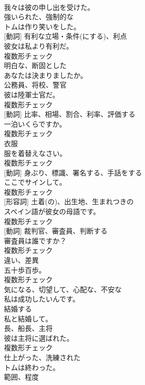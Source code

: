 \documentclass[8pt]{extreport}
\begin{document}
\begin{CJK}{UTF8}{min}
\\	我々は彼の申し出を受けた。	
\\	[形容詞]	強いられた、強制的な	
\\	トムは作り笑いをした。	
\\	[名詞] [動詞]	有利な立場・条件(にする)、利点	
\\	彼女は私より有利だ。	
\\	複数形チェック
\\	[形容詞]	明白な、断固とした	
\\	あなたは決まりましたか。	
\\	[名詞]	公務員、将校、警官	
\\	彼は陸軍士官だ。	
\\	複数形チェック
\\	[名詞] [動詞]	比率、相場、割合、利率、評価する	
\\	一泊いくらですか。	
\\	複数形チェック
\\	[名詞]	衣服	
\\	服を着替えなさい。	
\\	複数形チェック
\\	[名詞] [動詞]	身ぶり、標識、署名する、手話をする	
\\	ここでサインして。	
\\	複数形チェック
\\	[名詞] [形容詞]	土着(の)、出生地、生まれつきの	
\\	スペイン語が彼女の母語です。	
\\	複数形チェック
\\	[名詞] [動詞]	裁判官、審査員、判断する	
\\	審査員は誰ですか？	
\\	複数形チェック
\\	[名詞]	違い、差異	
\\	五十歩百歩。	
\\	複数形チェック
\\	[形容詞]	気になる、切望して、心配な、不安な	
\\	私は成功したいんです。	
\\	[動詞]	結婚する	
\\	私と結婚して。	
\\	[名詞]	長、船長、主将	
\\	彼は主将に選ばれた。	
\\	複数形チェック
\\	[形容詞]	仕上がった、洗練された	
\\	トムは終わった。	
\\	[名詞]	範囲、程度	

\end{CJK}
\end{document}
